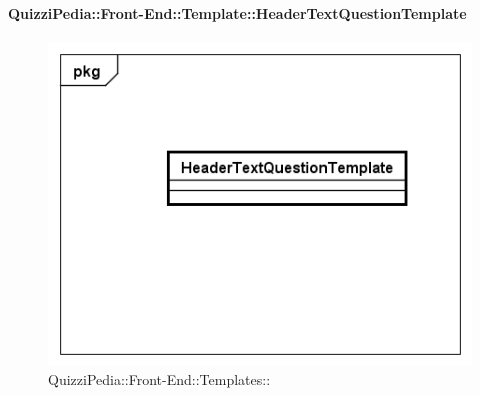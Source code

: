		\paragraph{QuizziPedia::Front-End::Template::HeaderTextQuestionTemplate}
		
		\label{QuizziPedia::Front-End::Templates::HeaderTextQuestionTemplate}
		
		\begin{figure}[ht]
			\centering
			\includegraphics[scale=0.5,keepaspectratio]{UML/Classi/Front-End/QuizziPedia_Front-end_Templates_HeaderTextQuestionTemplate.png}
			\caption{QuizziPedia::Front-End::Templates::}
		\end{figure} \FloatBarrier
		
